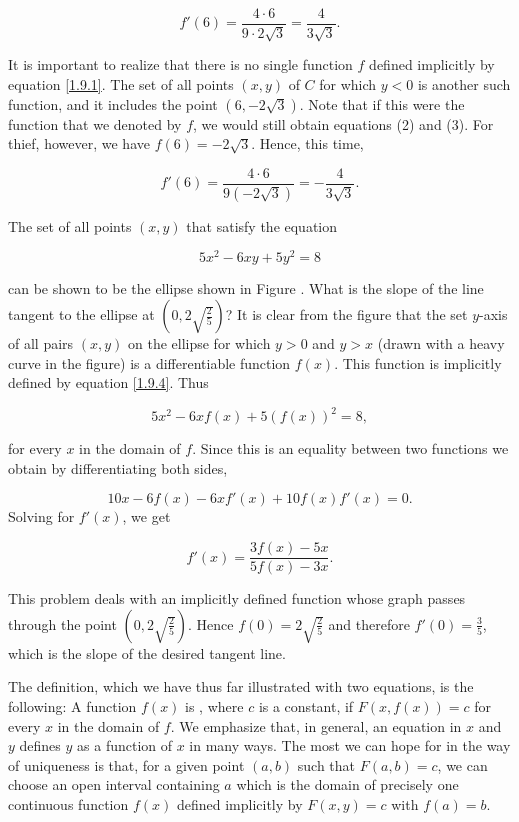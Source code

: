 $$
f'(6)= \frac{4 \cdot 6}{9 \cdot 2\sqrt3} = \frac{4}{3\sqrt3} .
$$

It is important to realize that there is no single function $f$ defined implicitly by equation \eqref{1.9.1}.
The set of all points $(x, y)$ of $C$ for which $y < 0$ is another such function, and it includes the point $(6, - 2\sqrt3)$. Note that if this were the function that we denoted by $f$, we would still obtain equations (2) and (3). For thief, however, we have $f(6) = - 2 \sqrt 3$. Hence, this time,

$$
f'(6) = \frac{4 \cdot 6}{9(-2\sqrt3)} = - \frac{4}{3\sqrt3}.
$$
  
\begin{example}
The set of all points $(x, y)$ that satisfy the equation
 
\begin{equation}
5x^2 - 6xy + 5y^2 = 8
\label{eq1.9.4}
\end{equation}


can be shown to be the ellipse shown in Figure .
What is the slope of the line tangent to the ellipse at $(0, 2\sqrt{\frac{2}{5}})$? It is clear from the figure that the set $y$-axis of all pairs $(x, y)$ on the ellipse for which $y > 0$ and $y > x$ (drawn with a heavy curve in the figure) is a differentiable function $f(x)$. This function is implicitly defined by equation \eqref{1.9.4}.
Thus

$$
5x^2 - 6xf(x) + 5(f(x))^2 = 8,
$$

for every $x$ in the domain of $f$. Since this is an equality between two functions we obtain by differentiating both sides, 

$$
10x - 6f(x) - 6xf'(x) + 10f(x)f'(x) = 0.
$$
Solving for $f'(x)$, we get

$$
f'(x)= \frac{3f(x) - 5x}{5f(x) - 3x}.
$$

This problem deals with an implicitly defined function whose graph passes through the point $(0, 2\sqrt{\frac{2}{5}})$. Hence $f(0) = 2\sqrt{\frac{2}{5}}$ and therefore $f'(0) = \frac{3}{5}$, which is the slope of the desired tangent line.
\end{example}
\medskip

The definition, which we have thus far illustrated with two equations, is the following:
A function $f(x)$ is ,
where $c$ is a constant,
if $F(x, f(x)) = c$ for every $x$ in the domain of $f$.
We emphasize that, in general, an equation in $x$ and $y$ defines $y$ as a function of $x$ in many ways.
The most we can hope for in the way of uniqueness is that,
for a given point $(a, b)$ such that $F(a, b) = c$,
we can choose an open interval containing $a$
which is the domain of precisely one continuous function $f(x)$
defined implicitly by $F(x, y) = c$ with $f(a) = b$.

